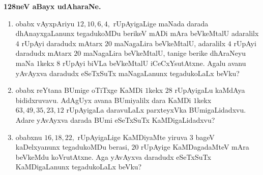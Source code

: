 \begin{center}
{\bf\large 128neV aBayx udAharaNe.}
\end{center}

\begin{enumerate}[\rm(1)]
\item obabx vAyxpAriyu $12, 10, 6, 4,$ rUpAyigaLige maNada darada dhAnayxgaLanunx tegadukoMDu berikeV mADi mAra beVkeMtalU adaralilx $4$ rUpAyi daradudx mAtarx $20$ maNagaLira beVkeMtalU, adaralilx $4$ rUpAyi daradudx mAtarx $20$ maNagaLira beVkeMtalU, tanige berike dhAraNeyu maNa $1$kekx $8$ rUpAyi biVLa beVkeMtalU iCeCxYsutAtxne. Agalu avanu yAvAyxva daradudx eSeTxSuTx maNagaLanunx tegadukoLaLx beVku?

\item obabx reYtana BUmige oTiTxge KaMDi $1$kekx $28$ rUpAyigaLu kaMdAya bididxruvavu. AdAgUyx avana BUmiyalilx dara KaMDi $1$kekx $63, 49, 35, 23, 12$ rUpAyigaLa daravuLaLx parxteyxVka BUmigaLidadxvu. Adare yAvAyxva darada BUmi eSeTxSuTx KaMDigaLidadxvu?

\item obabxnu $16, 18, 22,$ rUpAyigaLige KaMDiyaMte yiruva $3$ bageV kaDelxyanunx tegadukoMDu berasi, $20$ rUpAyige KaMDagadaMteV mAra beVkeMdu koVrutAtxne. Aga yAvAyxva daradudx eSeTxSuTx KaMDigaLanunx tegadukoLaLx beVku? 

\end{enumerate}

 
